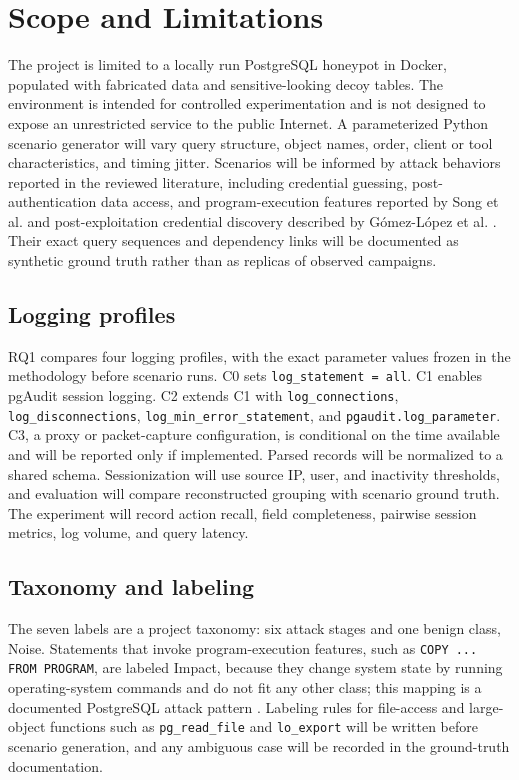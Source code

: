 \documentclass[12pt,a4paper]{report}
\begin{document}
\section{Scope and Limitations}
The project is limited to a locally run PostgreSQL honeypot in Docker, populated with fabricated data and sensitive-looking decoy tables. The environment is intended for controlled experimentation and is not designed to expose an unrestricted service to the public Internet. A parameterized Python scenario generator will vary query structure, object names, order, client or tool characteristics, and timing jitter. Scenarios will be informed by attack behaviors reported in the reviewed literature, including credential guessing, post-authentication data access, and program-execution features reported by Song et al. \cite{song_decoy_2025} and post-exploitation credential discovery described by Gómez-López et al. \cite{gomez-lopez_multi-agent_2026}. Their exact query sequences and dependency links will be documented as synthetic ground truth rather than as replicas of observed campaigns.

\subsection*{Logging profiles}
RQ1 compares four logging profiles, with the exact parameter values frozen in the methodology before scenario runs. C0 sets \texttt{log\_statement = all}. C1 enables pgAudit session logging. C2 extends C1 with \texttt{log\_connections}, \texttt{log\_disconnections}, \texttt{log\_min\_error\_statement}, and \texttt{pgaudit.log\_parameter}. C3, a proxy or packet-capture configuration, is conditional on the time available and will be reported only if implemented. Parsed records will be normalized to a shared schema. Sessionization will use source IP, user, and inactivity thresholds, and evaluation will compare reconstructed grouping with scenario ground truth. The experiment will record action recall, field completeness, pairwise session metrics, log volume, and query latency.

\subsection*{Taxonomy and labeling}
The seven labels are a project taxonomy: six attack stages and one benign class, Noise. Statements that invoke program-execution features, such as \texttt{COPY ... FROM PROGRAM}, are labeled Impact, because they change system state by running operating-system commands and do not fit any other class; this mapping is a documented PostgreSQL attack pattern \cite{song_decoy_2025}. Labeling rules for file-access and large-object functions such as \texttt{pg\_read\_file} and \texttt{lo\_export} will be written before scenario generation, and any ambiguous case will be recorded in the ground-truth documentation.
\end{document}
